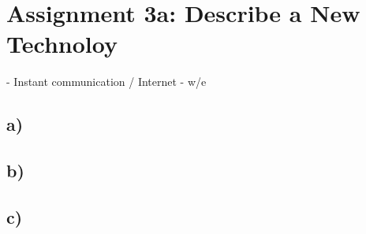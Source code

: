 \section*{Assignment 3a: Describe a New Technoloy}

- Instant communication / Internet
- w/e

\subsection*{a)}

\subsection*{b)}

\subsection*{c)}
